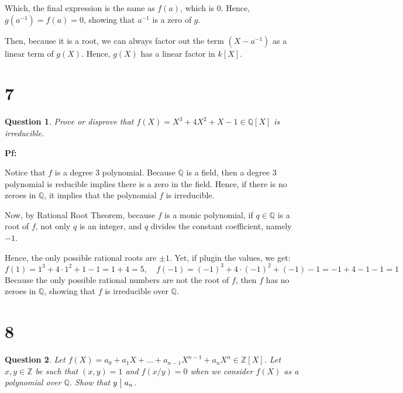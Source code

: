 \documentclass{article}
\newtheorem{question}{Question}
\begin{document}
Which, the final expression is the same as $f(a)$, which is $0$. Hence, $g(a^{-1})=f(a)=0$, showing that $a^{-1}$ is a zero of $g$.

Then, because it is a root, we can always factor out the term $(X-a^{-1})$ as a linear term of $g(X)$. Hence, $g(X)$ has a linear factor in $k[X]$.

\hfill

\hfill

\section*{7}
\begin{myBox}[]{}
    \begin{question}
        Prove or disprove that $f (X) = X^3 + 4X^2 + X - 1 \in \mathbb{Q}[X]$ is irreducible.
    \end{question}
\end{myBox}

\textbf{Pf:}

Notice that $f$ is a degree $3$ polynomial. Because $\mathbb{Q}$ is a field, then a degree $3$ polynomial is reducible implies there is a zero in the field.
Hence, if there is no zeroes in $\mathbb{Q}$, it implies that the polynomial $f$ is irreducible.

Now, by Rational Root Theorem, because $f$ is a monic polynomial, if $q\in\mathbb{Q}$ is a root of $f$, not only $q$ is an integer,
and $q$ divides the constant coefficient, namely $-1$.

Hence, the only possible rational roots are $\pm 1$. Yet, if plugin the values, we get:
$$f(1)=1^3+4\cdot 1^2+1-1 = 1+4 = 5,\quad f(-1)=(-1)^3+4\cdot (-1)^2+(-1)-1 = -1+4-1-1 = 1$$
Because the only possible rational numbers are not the root of $f$, then $f$ has no zeroes in $\mathbb{Q}$, showing that $f$ is irreducible over $\mathbb{Q}$.

\break

\section*{8}
\begin{myBox}[]{}
    \begin{question}
        Let $f (X) = a_0 + a_1X + ... + a_{n-1}X^{n-1} + a_nX^n \in\mathbb{Z}[X]$. Let $x,y\in\mathbb{Z}$ be such that
        $(x, y) = 1$ and $f (x/y) = 0$ when we consider $f (X)$ as a polynomial over $\mathbb{Q}$. Show that
        $y\bigm |a_n$.
    \end{question}
\end{myBox}
\end{document}
